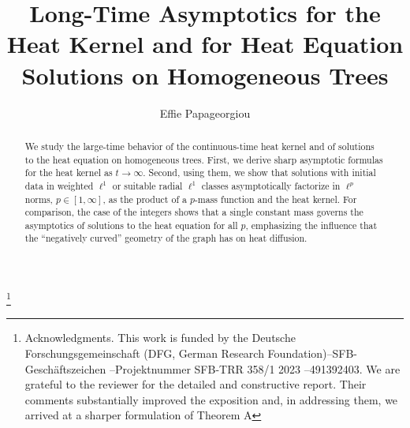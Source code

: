\documentclass[11pt,a4paper,reqno]{amsart}
\theoremstyle{plain}
\theoremstyle{remark}
\theoremstyle{definition}
\theoremstyle{remark}
\numberwithin{equation}{section}
\begin{document}
	
	\title[Long-Time Heat Asymptotics on Homogeneous Trees]{Long-Time Asymptotics for the Heat Kernel and for Heat Equation Solutions on Homogeneous Trees
	}
	\author{Effie Papageorgiou}


	
	
	
	\thanks{Acknowledgments. This work is funded by the
Deutsche Forschungsgemeinschaft (DFG, German Research Foundation)–SFB-Geschäftszeichen
–Projektnummer SFB-TRR 358/1 2023 –491392403. 
	We are grateful to the reviewer for the detailed and constructive report. Their comments substantially improved the exposition and, in addressing them, we arrived at a sharper formulation of Theorem A}
	
	
	
	\address[Effie Papageorgiou]{Institut f\"ur Mathematik \\ Universit\"at Paderborn\\
		D-33098 Paderborn \\ Germany}

	
\begin{abstract}
We study the large-time behavior of the continuous-time heat kernel and of solutions to the heat equation on homogeneous trees. First, we derive sharp asymptotic formulas for the heat kernel as $t\to\infty$. Second, using them, we show that solutions with initial data in weighted $\ell^1$ or suitable radial $\ell^1$ classes asymptotically factorize in $\ell^p$ norms, $p\in[1,\infty]$, as the product of a $p$-mass function and the heat kernel. For comparison, the case of the integers shows that a single constant mass governs the asymptotics of solutions to the heat equation for all $p$, emphasizing the influence that the ``negatively curved'' geometry of the graph has on heat diffusion.
\end{abstract}




\maketitle
\end{document}
